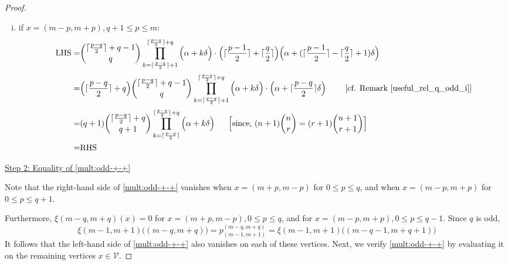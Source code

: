 \documentclass[10pt, a4paper, reqno]{amsart}
\begin{document}
\begin{proof}
\begin{enumerate}[(i)]
				
				\item if $x=(m-p,m+p), q+1\leq p\leq m$:	
				\[\begin{split}
					\text{LHS}	=& 		\displaystyle	\binom{\lceil \frac{p-q}{2} \rceil + q-1}{\,q\,}\prod_{k=\lceil \frac{p-q}{2} \rceil +1}^{\lceil \frac{p-q}{2} \rceil +q}\Big(\alpha +k\delta\Big)  \cdot  \Big(\lceil \frac{p-1}{2}\rceil+ \lceil \frac{q}{2}\rceil\Big)\Big(\alpha+(\lceil \frac{p-1}{2}\rceil- \lceil \frac{q}{2}\rceil+1)\delta\Big)\\
					=&	\displaystyle\Big( \lceil\frac{p-q}{2}\rceil+q\Big)	\binom{\lceil \frac{p-q}{2} \rceil + q-1}{\,q\,}\prod_{k=\lceil \frac{p-q}{2} \rceil +1}^{\lceil \frac{p-q}{2} \rceil +q}\Big(\alpha +k\delta\Big)  \cdot  \Big(\alpha+\lceil \frac{p-q}{2}\rceil\delta\Big) \text{ ~~~~~~[cf. Remark \ref{useful_rel_q_odd_i}]}  \\
					=&(q+1)	\displaystyle\binom{\lceil \frac{p-q}{2} \rceil+ q}{\,q+1\,}\prod_{k=\lceil \frac{p-q}{2} \rceil}^{\lceil \frac{p-q}{2} \rceil+q }\Big(\alpha+k\delta \Big)  ~~~~~ \text{\Big [since, $(n+1)\binom{n}{r}=(r+1)\binom{n+1}{r+1}$\Big]}  \\
					= &\text{RHS}
				\end{split}\]			
			\end{enumerate}
			
			
				\underline{Step 2:	Equality of  \eqref{mult:odd-+-+}} 


Note that the right-hand side of \eqref{mult:odd-+-+}  vanishes when $x = (m+p, m-p)$ for $0 \leq p \leq q$, 
and when $x = (m-p, m+p)$ for $0 \leq p \leq q+1$.  

	Furthermore, 	$\xi(m-q,m+q)(x)=0$ for $x = (m+p, m-p), 0 \leq p \leq q$, and  for $x = (m-p, m+p),0 \leq p \leq q-1$. Since $q$ is odd,
\[
\xi(m-1, m+1)\big((m-q, m+q)\big)
= p^{(m-q, m+q)}_{(m-1, m+1)}= \xi(m-1, m+1)\big((m-q-1, m+q+1)\big)
\]
It follows that the left-hand side of \eqref{mult:odd-+-+} also vanishes on each of these vertices.  Next, we verify \eqref{mult:odd-+-+} by evaluating it on the remaining vertices $x \in \mathcal{V}$.


\end{proof}
\end{document}

